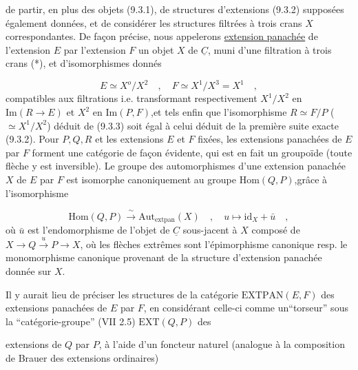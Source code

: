 
de partir, en plus des objets (9.3.1), de structures d'extensions (9.3.2) supposées également données, et de considérer les structures filtrées à trois crans $X$ correspondantes. De façon précise, nous appelerons \underline{extension panachée} de l'extension $E$ par l'extension $F$ un objet $X$ de $\underline{C}$, muni d'une filtration à trois crans (*), et d'isomorphismes donnés

\begin{equation}\tag{9.3.3}
E \simeq X^o/X^2 \quad , \quad F \simeq X^1/X^3 = X^1 \quad ,
\end{equation}
compatibles aux filtrations i.e. transformant respectivement $X^1/X^2$ en $\mathrm{Im}(R \longrightarrow E)$ et $X^2$ en $\mathrm{Im}(P,F)$,et tels enfin que l'isomorphisme $R \simeq F/P$ ($\simeq X^1/X^2$) déduit de (9.3.3) soit égal à celui déduit de la première suite exacte (9.3.2). Pour $P,Q,R$ et les extensions $E$ et $F$ fixées, les extensions panachées de $E$ par $F$ forment une catégorie de façon évidente, qui est en fait un groupoïde (toute flèche y est inversible). Le groupe des automorphismes d'une extension panachée $X$ de $E$ par $F$ est isomorphe canoniquement au groupe $\mathrm{Hom}(Q,P)$,grâce à l'isomorphisme

\begin{equation}\tag{9.3.4}
\mathrm{Hom}(Q,P) \xrightarrow{\ \sim\ } \mathrm{Aut}_{\mathrm{extpan}}(X) \quad , \quad u \longmapsto \mathrm{id}_X + \bar{u} \quad ,
\end{equation}
où $\bar{u}$ est l'endomorphisme de l'objet de $\underline{C}$ sous-jacent à $X$ composé de $X \longrightarrow Q \xrightarrow{\ u\ } P \longrightarrow X$, où les flèches extrêmes sont l'épimorphisme canonique resp. le monomorphisme canonique provenant de la structure d'extension panachée donnée sur $X$.

Il y aurait lieu de préciser les structures de la catégorie $\mathrm{EXTPAN}(E,F)$ des extensions panachées de $E$ par $F$, en considérant celle-ci comme un``torseur'' sous la ``catégorie-groupe'' (VII 2.5) $\mathrm{EXT}(Q,P)$ des



extensions de $Q$ par $P$, à l'aide d'un foncteur naturel (analogue à la composition de Brauer des extensions ordinaires)

